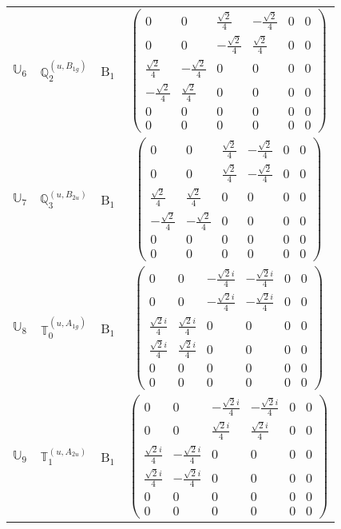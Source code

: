 \documentclass[fleqn,10pt,landscape]{article}
\begin{document}
\begin{itemize}
\begin{center}
\begin{longtable}{c|c|c|c}
$ \mathbb{U}_{6} $ & $\mathbb{Q}_{2}^{(u,B_{1g})}$ & B$_{1}$ & $\begin{pmatrix} 0 & 0 & \frac{\sqrt{2}}{4} & - \frac{\sqrt{2}}{4} & 0 & 0 \\ 0 & 0 & - \frac{\sqrt{2}}{4} & \frac{\sqrt{2}}{4} & 0 & 0 \\ \frac{\sqrt{2}}{4} & - \frac{\sqrt{2}}{4} & 0 & 0 & 0 & 0 \\ - \frac{\sqrt{2}}{4} & \frac{\sqrt{2}}{4} & 0 & 0 & 0 & 0 \\ 0 & 0 & 0 & 0 & 0 & 0 \\ 0 & 0 & 0 & 0 & 0 & 0 \end{pmatrix}$ \\
$ \mathbb{U}_{7} $ & $\mathbb{Q}_{3}^{(u,B_{2u})}$ & B$_{1}$ & $\begin{pmatrix} 0 & 0 & \frac{\sqrt{2}}{4} & - \frac{\sqrt{2}}{4} & 0 & 0 \\ 0 & 0 & \frac{\sqrt{2}}{4} & - \frac{\sqrt{2}}{4} & 0 & 0 \\ \frac{\sqrt{2}}{4} & \frac{\sqrt{2}}{4} & 0 & 0 & 0 & 0 \\ - \frac{\sqrt{2}}{4} & - \frac{\sqrt{2}}{4} & 0 & 0 & 0 & 0 \\ 0 & 0 & 0 & 0 & 0 & 0 \\ 0 & 0 & 0 & 0 & 0 & 0 \end{pmatrix}$ \\
$ \mathbb{U}_{8} $ & $\mathbb{T}_{0}^{(u,A_{1g})}$ & B$_{1}$ & $\begin{pmatrix} 0 & 0 & - \frac{\sqrt{2} i}{4} & - \frac{\sqrt{2} i}{4} & 0 & 0 \\ 0 & 0 & - \frac{\sqrt{2} i}{4} & - \frac{\sqrt{2} i}{4} & 0 & 0 \\ \frac{\sqrt{2} i}{4} & \frac{\sqrt{2} i}{4} & 0 & 0 & 0 & 0 \\ \frac{\sqrt{2} i}{4} & \frac{\sqrt{2} i}{4} & 0 & 0 & 0 & 0 \\ 0 & 0 & 0 & 0 & 0 & 0 \\ 0 & 0 & 0 & 0 & 0 & 0 \end{pmatrix}$ \\
$ \mathbb{U}_{9} $ & $\mathbb{T}_{1}^{(u,A_{2u})}$ & B$_{1}$ & $\begin{pmatrix} 0 & 0 & - \frac{\sqrt{2} i}{4} & - \frac{\sqrt{2} i}{4} & 0 & 0 \\ 0 & 0 & \frac{\sqrt{2} i}{4} & \frac{\sqrt{2} i}{4} & 0 & 0 \\ \frac{\sqrt{2} i}{4} & - \frac{\sqrt{2} i}{4} & 0 & 0 & 0 & 0 \\ \frac{\sqrt{2} i}{4} & - \frac{\sqrt{2} i}{4} & 0 & 0 & 0 & 0 \\ 0 & 0 & 0 & 0 & 0 & 0 \\ 0 & 0 & 0 & 0 & 0 & 0 \end{pmatrix}$ \\

\end{longtable}
\end{center}
\end{itemize}
\end{document}
